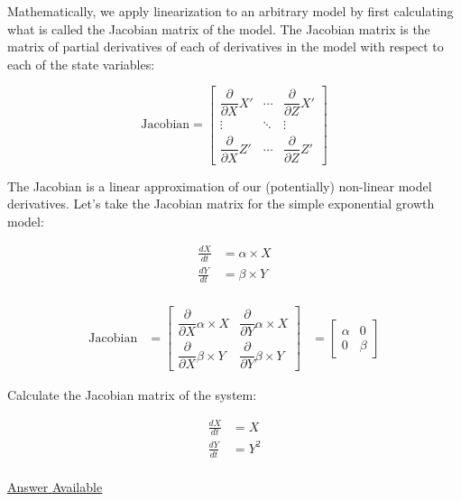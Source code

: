 \documentclass[]{memoir}
\begin{document}
Mathematically, we apply linearization to an arbitrary model by first
calculating what is called the Jacobian matrix of the model. The
Jacobian matrix is the matrix of partial derivatives of each of
derivatives in the model with respect to each of the state variables:

\[ \text{Jacobian} = \begin{bmatrix} \dfrac{\partial }{\partial X} X' & \cdots & \dfrac{\partial }{\partial Z} X' \\ \vdots & \ddots & \vdots \\ \dfrac{\partial }{\partial X} Z' & \cdots & \dfrac{\partial }{\partial Z} Z'  \end{bmatrix} \]

The Jacobian is a linear approximation of our (potentially) non-linear
model derivatives. Let's take the Jacobian matrix for the simple
exponential growth model:

\[
\begin{aligned}
\frac{dX}{dt} &= \alpha \times X \\
\frac{dY}{dt} &= \beta \times Y \\
\end{aligned}
\]

\[
\begin{aligned}
\text{Jacobian} &= \begin{bmatrix} \dfrac{\partial}{\partial X } \alpha \times X & \dfrac{\partial}{\partial Y } \alpha \times X  \\  \dfrac{\partial}{\partial X } \beta \times Y & \dfrac{\partial}{\partial Y } \beta \times Y \end{bmatrix}
&= \begin{bmatrix} \alpha  & 0 \\ 0 & \beta \end{bmatrix}
\end{aligned}
\]


Calculate the Jacobian matrix of the system:

\[
\begin{aligned}
\frac{dX}{dt} &=  X \\
\frac{dY}{dt} &= Y^2 \\
\end{aligned}
\]

\hyperref[Ans-11-9]{Answer Available}
\end{document}
